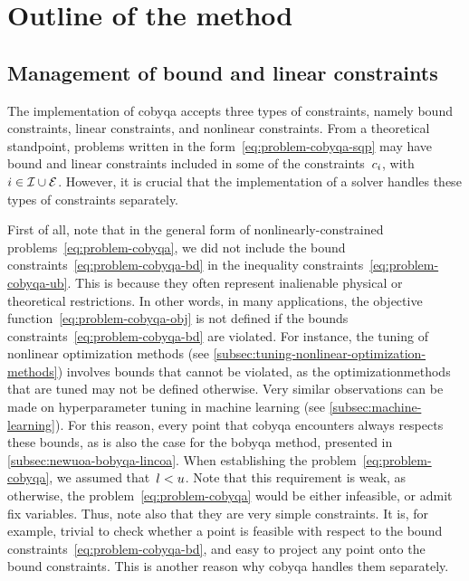 \section{Outline of the  method}

\subsection{Management of bound and linear constraints}
\label{subsec:bound-constraints}

The implementation of \gls{cobyqa} accepts three types of constraints, namely bound constraints, linear constraints, and nonlinear constraints.
From a theoretical standpoint, problems written in the form~\cref{eq:problem-cobyqa-sqp} may have bound and linear constraints included in some of the constraints~$c_{i}$, with~$i \in \mathcal{I} \cup \mathcal{E}$.
However, it is crucial that the implementation of a solver handles these types of constraints separately.

First of all, note that in the general form of nonlinearly-constrained problems~\cref{eq:problem-cobyqa}, we did not include the bound constraints~\cref{eq:problem-cobyqa-bd} in the inequality constraints~\cref{eq:problem-cobyqa-ub}.
This is because they often represent inalienable physical or theoretical restrictions.
In other words, in many applications, the objective function~\cref{eq:problem-cobyqa-obj} is not defined if the bounds constraints~\cref{eq:problem-cobyqa-bd} are violated.
For instance, the tuning of nonlinear optimization methods (see \cref{subsec:tuning-nonlinear-optimization-methods})  involves bounds that cannot be violated, as the optimizationmethods that are tuned may not be defined otherwise.
Very similar observations can be made on hyperparameter tuning in machine learning (see \cref{subsec:machine-learning}).
For this reason, every point that \gls{cobyqa} encounters always respects these bounds, as is also the case for the \gls{bobyqa} method, presented in \cref{subsec:newuoa-bobyqa-lincoa}.
When establishing the problem~\cref{eq:problem-cobyqa}, we assumed that~$l < u$.
Note that this requirement is weak, as otherwise, the problem~\cref{eq:problem-cobyqa} would be either infeasible, or admit fix variables.
Thus, note also that they are very simple constraints.
It is, for example, trivial to check whether a point is feasible with respect to the bound constraints~\cref{eq:problem-cobyqa-bd}, and easy to project any point onto the bound constraints.
This is another reason why \gls{cobyqa} handles them separately.

